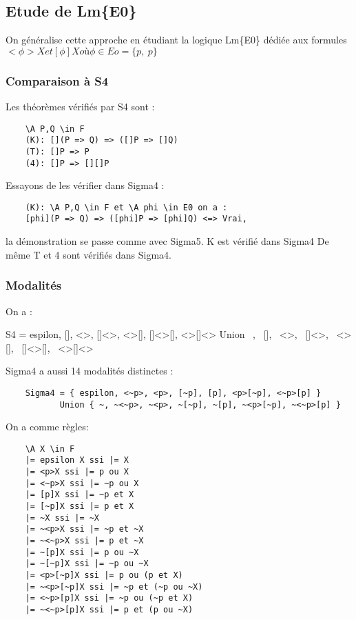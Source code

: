 \documentclass[a4paper,10pt]{article}
\begin{document}
  \subsection{Etude de Lm\{E0\}}
  
  On généralise cette approche en étudiant la logique  Lm\{E0\}  dédiée aux formules $<\phi>X et [\phi]X où \phi \in Eo = \{p,~p\}$
  
   \subsubsection{Comparaison \`{a} S4}
   
   Les théorèmes vérifiés par S4 sont :
   \begin{lstlisting}
	\A P,Q \in F
	(K): [](P => Q) => ([]P => []Q)
	(T): []P => P
	(4): []P => [][]P
   \end{lstlisting}
	Essayons de les vérifier dans Sigma4 :
   \begin{lstlisting}
	(K): \A P,Q \in F et \A phi \in E0 on a :
	[phi](P => Q) => ([phi]P => [phi]Q) <=> Vrai, 
   \end{lstlisting}
la démonstration se passe comme avec Sigma5. K est vérifié dans Sigma4
De même T et 4 sont vérifiés dans Sigma4.
	
   \subsubsection{Modalit\'{e}s}
   
   On a :

        S4 = { espilon, [], <>, []<>, <>[], []<>[], <>[]<>} Union { ~, ~[], ~<>, ~[]<>, ~<>[], ~[]<>[], ~<>[]<>}

Sigma4 a aussi 14 modalités distinctes :
	\begin{lstlisting}
	Sigma4 = { espilon, <~p>, <p>, [~p], [p], <p>[~p], <~p>[p] } 
	       Union { ~, ~<~p>, ~<p>, ~[~p], ~[p], ~<p>[~p], ~<~p>[p] }
	\end{lstlisting}
On a comme règles:
	\begin{lstlisting}
	\A X \in F
	|= epsilon X ssi |= X
	|= <p>X ssi |= p ou X
	|= <~p>X ssi |= ~p ou X
	|= [p]X ssi |= ~p et X
	|= [~p]X ssi |= p et X
	|= ~X ssi |= ~X
	|= ~<p>X ssi |= ~p et ~X
	|= ~<~p>X ssi |= p et ~X
	|= ~[p]X ssi |= p ou ~X
	|= ~[~p]X ssi |= ~p ou ~X
	|= <p>[~p]X ssi |= p ou (p et X)
	|= ~<p>[~p]X ssi |= ~p et (~p ou ~X)
	|= <~p>[p]X ssi |= ~p ou (~p et X)
	|= ~<~p>[p]X ssi |= p et (p ou ~X)
	\end{lstlisting}
\end{document}

